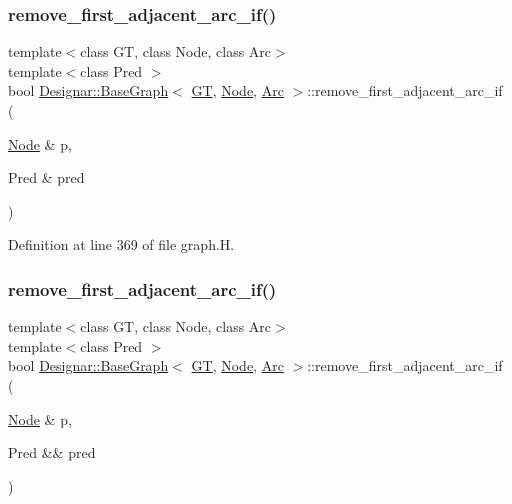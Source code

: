 \subsubsection{\texorpdfstring{remove\+\_\+first\+\_\+adjacent\+\_\+arc\+\_\+if()}{remove\_first\_adjacent\_arc\_if()}\hspace{0.1cm}{\footnotesize\ttfamily [1/2]}}
{\footnotesize\ttfamily template$<$class GT, class Node, class Arc$>$ \\
template$<$class Pred $>$ \\
bool \hyperlink{class_designar_1_1_base_graph}{Designar\+::\+Base\+Graph}$<$ \hyperlink{demo-buildgraph_8_c_a3001c40d2c31ca87ed96cd7d1334a55e}{GT}, \hyperlink{namespace_designar_a5af326c65aa2bd26b26c410f2030d09e}{Node}, \hyperlink{namespace_designar_a3f55fb5513d62ff47cbc8f72b8e95d6f}{Arc} $>$\+::remove\+\_\+first\+\_\+adjacent\+\_\+arc\+\_\+if (\begin{DoxyParamCaption}\item[{\hyperlink{namespace_designar_a5af326c65aa2bd26b26c410f2030d09e}{Node} \&}]{p,  }\item[{Pred \&}]{pred }\end{DoxyParamCaption})\hspace{0.3cm}{\ttfamily [inline]}}



Definition at line 369 of file graph.\+H.

\mbox{\label{class_designar_1_1_base_graph_abe36f7676c51362b9a0f560d3c062772}} 
\subsubsection{\texorpdfstring{remove\+\_\+first\+\_\+adjacent\+\_\+arc\+\_\+if()}{remove\_first\_adjacent\_arc\_if()}\hspace{0.1cm}{\footnotesize\ttfamily [2/2]}}
{\footnotesize\ttfamily template$<$class GT, class Node, class Arc$>$ \\
template$<$class Pred $>$ \\
bool \hyperlink{class_designar_1_1_base_graph}{Designar\+::\+Base\+Graph}$<$ \hyperlink{demo-buildgraph_8_c_a3001c40d2c31ca87ed96cd7d1334a55e}{GT}, \hyperlink{namespace_designar_a5af326c65aa2bd26b26c410f2030d09e}{Node}, \hyperlink{namespace_designar_a3f55fb5513d62ff47cbc8f72b8e95d6f}{Arc} $>$\+::remove\+\_\+first\+\_\+adjacent\+\_\+arc\+\_\+if (\begin{DoxyParamCaption}\item[{\hyperlink{namespace_designar_a5af326c65aa2bd26b26c410f2030d09e}{Node} \&}]{p,  }\item[{Pred \&\&}]{pred }\end{DoxyParamCaption})\hspace{0.3cm}{\ttfamily [inline]}}



